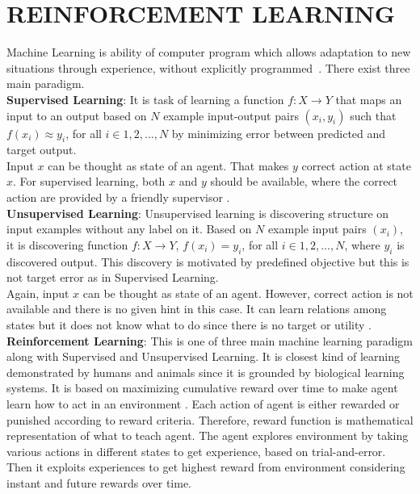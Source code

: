 \chapter{REINFORCEMENT LEARNING}
\label{chap:rl_chap}
Machine Learning is ability of computer program which allows adaptation to new situations through experience, without explicitly programmed~\cite{mitchell_machine_1997}. There exist three main paradigm. \\
\textbf{Supervised Learning}: It is task of learning a function $f \colon X \rightarrow Y$ that maps an input to an output based on $N$ example input-output pairs $(x_i,y_i)$ such that $ f(x_i) \approx y_i$, for all $i \in {1,2,...,N}$ by minimizing error between predicted and target output. \\
Input $x$ can be thought as state of an agent. That makes $y$ correct action at state $x$. For supervised learning, both $x$ and $y$ should be available, where the correct action are provided by a friendly supervisor \cite{russell_artificial_nodate}. \\
\textbf{Unsupervised Learning}:
Unsupervised learning is discovering structure on input examples without any label on it. Based on $N$ example input pairs $(x_i)$, it is discovering function $f \colon X \rightarrow Y$, $ f(x_i) = y_i$, for all $i \in {1,2,...,N} $, where $y_i$ is discovered output. This discovery is motivated by predefined objective but this is not target error as in Supervised Learning. \\
Again, input $x$ can be thought as state of an agent. However, correct action is not available and there is no given hint in this case. It can learn relations among states but it does not know what to do since there is no target or utility \cite{russell_artificial_nodate}. \\
\textbf{Reinforcement Learning}: This is one of three main machine learning paradigm along with Supervised and Unsupervised Learning. It is closest kind of learning demonstrated by humans and animals since it is grounded by biological learning systems. It is based on maximizing cumulative reward over time to make agent learn how to act in an environment \cite{sutton_reinforcement_1998}. Each action of agent is either rewarded or punished according to reward criteria. Therefore, reward function is mathematical representation of what to teach agent. The agent explores environment by taking various actions in different states to get experience, based on trial-and-error. Then it exploits experiences to get highest reward from environment considering instant and future rewards over time. \\
